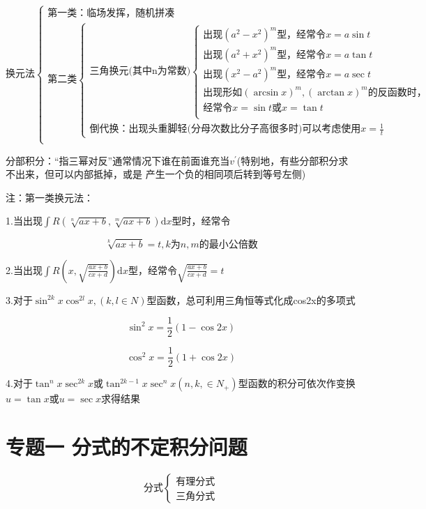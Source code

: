 \documentclass[a4paper,11pt]{book}
\begin{document}
\[
\text{换元法}    
\begin{cases}
    \text{第一类：临场发挥，随机拼凑}\\
    \text{第二类}
        \begin{cases}
            \text{三角换元(其中n为常数)}
                \begin{cases}
                    \text{出现}\left(a^{2}-x^{2}\right)^{m}\text{型，经常令}x=a\sin t\\
                    \text{出现}\left(a^{2}+x^{2}\right)^{m}\text{型，经常令}x=a\tan t\\
                    \text{出现}\left(x^{2}-a^{2}\right)^{m}\text{型，经常令}x=a \sec t\\
                    \text{出现形如}(\arcsin x)^{m},(\arctan x)^{m}\text{的反函数时，}\\
                    \text{经常令}x=\sin t \text{或}x=\tan t\\
                \end{cases}\\  
            \text{倒代换：出现头重脚轻(分母次数比分子高很多时)}\text{可以考虑使用}x=\frac{1}{t}
        \end{cases}\\
\end{cases}
\]

分部积分：“指三幂对反”通常情况下谁在前面谁充当$v^{\prime}$(特别地，有些分部积分求不出来，但可以内部抵掉，或是
产生一个负的相同项后转到等号左侧)

注：第一类换元法：

1.当出现$\int R (\sqrt[n]{ax+b},\sqrt[m]{ax+b})\mathrm{d}x$型时，经常令

\[
  \sqrt[k]{ax+b} =t,k\text{为}n,m\text{的最小公倍数} 
\]

2.当出现$\displaystyle{\int R\left(x,\sqrt{\frac{ax+b}{cx+d}}\right)\mathrm{d}x}$型，经常令$\displaystyle{\sqrt{\frac{ax+b}{cx+d}}=t}$

3.对于$\sin ^{2k}x\cos ^{2l}x,(k,l \in N)$型函数，总可利用三角恒等式化成cos2x的多项式

\[
    \sin ^{2} x=\frac{1}{2}(1-\cos 2 x)
\]

\[
    \cos ^{2} x=\frac{1}{2}(1+\cos 2 x)  
\]

4.对于$\tan ^{n} x \sec ^{2 k} x$或$\tan ^{2 k-1} x \sec ^{n} x\left(n, k, \in N_{+}\right)$型函数的积分可依次作变换
$u=\tan x$或$u=\sec x$求得结果

\section*{专题一 \quad 分式的不定积分问题}
\[
\text{分式}
\begin{cases}
    \text{有理分式}\\
    \text{三角分式}
\end{cases}    
\]
\end{document}
